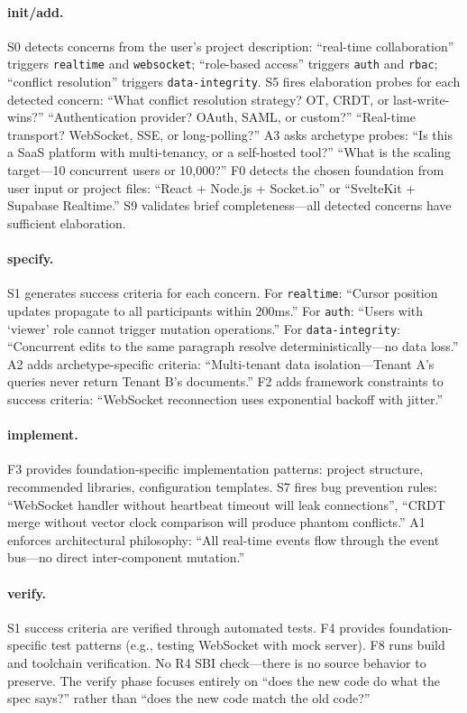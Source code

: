 \documentclass[11pt,a4paper,openright,twoside]{report}
\begin{document}
\paragraph{init/add.}
S0 detects concerns from the user's project description: ``real-time collaboration'' triggers \texttt{realtime} and \texttt{websocket}; ``role-based access'' triggers \texttt{auth} and \texttt{rbac}; ``conflict resolution'' triggers \texttt{data-integrity}. S5 fires elaboration probes for each detected concern: ``What conflict resolution strategy? OT, CRDT, or last-write-wins?'' ``Authentication provider? OAuth, SAML, or custom?'' ``Real-time transport? WebSocket, SSE, or long-polling?'' A3 asks archetype probes: ``Is this a SaaS platform with multi-tenancy, or a self-hosted tool?'' ``What is the scaling target---10 concurrent users or 10,000?'' F0 detects the chosen foundation from user input or project files: ``React + Node.js + Socket.io'' or ``SvelteKit + Supabase Realtime.'' S9 validates brief completeness---all detected concerns have sufficient elaboration.

\paragraph{specify.}
S1 generates success criteria for each concern. For \texttt{realtime}: ``Cursor position updates propagate to all participants within 200ms.'' For \texttt{auth}: ``Users with `viewer' role cannot trigger mutation operations.'' For \texttt{data-integrity}: ``Concurrent edits to the same paragraph resolve deterministically---no data loss.'' A2 adds archetype-specific criteria: ``Multi-tenant data isolation---Tenant A's queries never return Tenant B's documents.'' F2 adds framework constraints to success criteria: ``WebSocket reconnection uses exponential backoff with jitter.''

\paragraph{implement.}
F3 provides foundation-specific implementation patterns: project structure, recommended libraries, configuration templates. S7 fires bug prevention rules: ``WebSocket handler without heartbeat timeout will leak connections'', ``CRDT merge without vector clock comparison will produce phantom conflicts.'' A1 enforces architectural philosophy: ``All real-time events flow through the event bus---no direct inter-component mutation.''

\paragraph{verify.}
S1 success criteria are verified through automated tests. F4 provides foundation-specific test patterns (e.g., testing WebSocket with mock server). F8 runs build and toolchain verification. No R4 SBI check---there is no source behavior to preserve. The verify phase focuses entirely on ``does the new code do what the spec says?'' rather than ``does the new code match the old code?''
\end{document}

